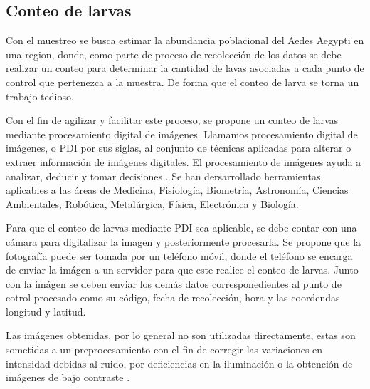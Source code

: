 \subsection{Conteo de larvas}
Con el muestreo se busca estimar la abundancia poblacional del Aedes Aegypti en una region, donde,
como parte de proceso de recolección de los datos se debe realizar un conteo para determinar la
cantidad de lavas asociadas a cada punto de control que pertenezca a la muestra. De forma que el
conteo de larva se torna un trabajo tedioso.

Con el fin de agilizar y facilitar este proceso, se propone un conteo de larvas mediante
procesamiento digital de imágenes. Llamamos procesamiento digital de imágenes, o PDI por sus
siglas, al conjunto de técnicas aplicadas para alterar o extraer información de imágenes digitales.
El procesamiento de imágenes ayuda a analizar, deducir y tomar decisiones
\citep{ortiz2013procesamiento}. Se han dersarrollado herramientas aplicables a las áreas de
Medicina, Fisiología, Biometría, Astronomía, Ciencias Ambientales, Robótica, Metalúrgica, Física,
Electrónica y Biología.

Para que el conteo de larvas mediante PDI sea aplicable, se debe contar con una cámara para
digitalizar la imagen y posteriormente procesarla. Se propone que la fotografía puede ser tomada
por un teléfono móvil, donde el teléfono se encarga de enviar la imágen a un servidor para que
este realice el conteo de larvas. Junto con la imágen se deben enviar los demás datos
corresponedientes al punto de cotrol procesado como su código, fecha de recolección, hora y las
coordendas longitud y latitud.

Las imágenes obtenidas, por lo general no son utilizadas directamente, estas son sometidas a un preprocesamiento con el fin de corregir las variaciones en intensidad debidas al ruido, por
deficiencias en la iluminación o la obtención de imágenes de bajo contraste
\citep{santillan2008deteccion}.

